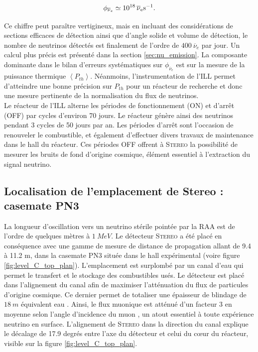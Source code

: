 \begin{equation} 
\phi_{\overline{\nu}_e} \simeq \SI{E18}{\overline{\nu}_e s^{-1}}. 
\end{equation} 

\bigbreak 

Ce chiffre peut paraître vertigineux, mais en incluant des considérations de sections efficaces de détection ainsi que d'angle solide et volume de détection, le nombre de neutrinos détectés est finalement de l'ordre de $\SI{400}{\overline{\nu}_e}$ par jour. Un calcul plus précis est présenté dans la section \ref{sec:nu_emission}. La composante dominante dans le bilan d'erreurs systématiques sur $\phi_{\overline{\nu}_e}$ est sur la mesure de la puissance thermique $\left<P_{th}\right>$. Néanmoins, l'instrumentation de l'ILL permet d'atteindre une bonne précision sur $P_{th}$ pour un réacteur de recherche et donc une mesure pertinente de la normalisation du flux de neutrinos.\\ 

Le réacteur de l'ILL alterne les périodes de fonctionnement (ON) et d'arrêt (OFF) par cycles d'environ 70 jours. Le réacteur génère ainsi des neutrinos pendant 3 cycles de 50 jours par an. Les périodes d'arrêt sont l'occasion de renouveler le combustible, et également d'effectuer divers travaux de maintenance dans le hall du réacteur. Ces périodes OFF offrent à \textsc{Stereo} la possibilité de mesurer les bruits de fond d'origine cosmique, élément essentiel à l'extraction du signal neutrino.\\ 


\subsection{Localisation de l'emplacement de Stereo : casemate PN3} 

La longueur d'oscillation vers un neutrino stérile pointée par la RAA est de l'ordre de quelques mètres à $\SI{1}{MeV}$. Le détecteur \textsc{Stereo} a été placé en conséquence avec une gamme de mesure de distance de propagation allant de 9.4 à 11.2 m, dans la casemate PN3 située dans le hall expérimental (voire figure \ref{fig:level_C_top_plan}). L'emplacement est surplombé par un canal d'eau qui permet le transfert et le stockage des combustibles usés. Le détecteur est placé dans l'alignement du canal afin de maximiser l'atténuation du flux de particules d'origine cosmique. Ce dernier permet de totaliser une épaisseur de blindage de $\SI{18}{m}$ équivalent eau \cite{LASSERRE201481}. Ainsi, le flux muonique est atténué d'un facteur 3 en moyenne selon l'angle d'incidence du muon \cite{docdb31}, un atout essentiel à toute expérience neutrino en surface. L'alignement de \textsc{Stereo} dans la direction du canal explique le décalage de 17.9 degrés entre l'axe du détecteur et celui du c\oe ur du réacteur, visible sur la figure \ref{fig:level_C_top_plan}.\\ 


